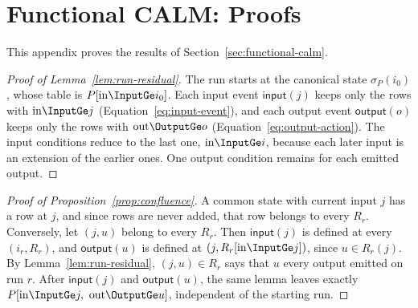 \section{Functional CALM: Proofs}
\label{app:proofs-sec2}

This appendix proves the results of Section~\ref{sec:functional-calm}.

\begin{proof}[Proof of Lemma~\ref{lem:run-residual}]
The run starts at the canonical state $\sigma_P(i_0)$, whose table is
$P[\mathrm{in}\InputGe i_0]$. Each input event $\mathsf{input}(j)$ keeps only
the rows with $\mathrm{in}\InputGe j$ (Equation~\ref{eq:input-event}), and each
output event $\mathsf{output}(o)$ keeps only the rows with
$\mathrm{out}\OutputGe o$ (Equation~\ref{eq:output-action}). The input
conditions reduce to the last one, $\mathrm{in}\InputGe i$, because each later
input is an extension of the earlier ones. One output condition remains for each
emitted output.
\end{proof}

\begin{proof}[Proof of Proposition~\ref{prop:confluence}]
A common state with current input $j$ has a row at $j$, and since rows are
never added, that row belongs to every $R_r$.  Conversely, let $(j,u)$ belong
to every $R_r$.  Then $\mathsf{input}(j)$ is defined at every $(i_r,R_r)$, and
$\mathsf{output}(u)$ is defined at $(j,R_r[\mathrm{in}\InputGe j])$, since
$u\in R_r(j)$.  By
Lemma~\ref{lem:run-residual}, $(j,u)\in R_r$ says that $u$ \outrel every output
emitted on run $r$.  After $\mathsf{input}(j)$ and $\mathsf{output}(u)$, the
same lemma leaves exactly
$P[\mathrm{in}\InputGe j,\ \mathrm{out}\OutputGe u]$, independent of the
starting run.
\end{proof}

